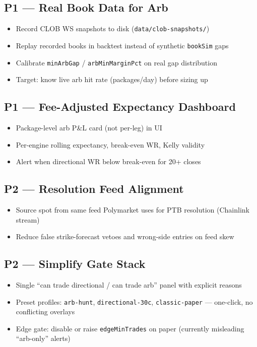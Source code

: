 \documentclass[11pt,a4paper]{article}
\begin{document}
\subsection{P1 --- Real Book Data for Arb}
\begin{itemize}
  \item Record CLOB WS snapshots to disk (\texttt{data/clob-snapshots/})
  \item Replay recorded books in backtest instead of synthetic \texttt{bookSim} gaps
  \item Calibrate \texttt{minArbGap} / \texttt{arbMinMarginPct} on real gap distribution
  \item Target: know live arb hit rate (packages/day) before sizing up
\end{itemize}

\subsection{P1 --- Fee-Adjusted Expectancy Dashboard}
\begin{itemize}
  \item Package-level arb P\&L card (not per-leg) in UI
  \item Per-engine rolling expectancy, break-even WR, Kelly validity
  \item Alert when directional WR below break-even for 20+ closes
\end{itemize}

\subsection{P2 --- Resolution Feed Alignment}
\begin{itemize}
  \item Source spot from same feed Polymarket uses for PTB resolution (Chainlink stream)
  \item Reduce false strike-forecast vetoes and wrong-side entries on feed skew
\end{itemize}

\subsection{P2 --- Simplify Gate Stack}
\begin{itemize}
  \item Single ``can trade directional / can trade arb'' panel with explicit reasons
  \item Preset profiles: \texttt{arb-hunt}, \texttt{directional-30c}, \texttt{classic-paper} --- one-click, no conflicting overlays
  \item Edge gate: disable or raise \texttt{edgeMinTrades} on paper (currently misleading ``arb-only'' alerts)
\end{itemize}
\end{document}
